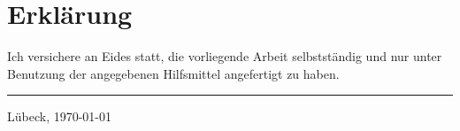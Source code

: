 
\chapter*{Erklärung}
Ich versichere an Eides statt, die vorliegende Arbeit selbstständig und nur
unter Benutzung der angegebenen Hilfsmittel angefertigt zu haben.

\vspace{5em}


\rule{0.4\textwidth}{0.4pt}

Lübeck, \today
